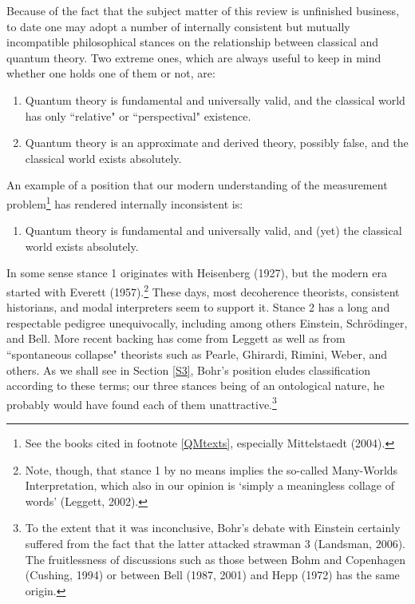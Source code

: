 \documentclass[12pt,titlepage]{article}
\begin{document}
Because of the fact that the subject matter of this review is unfinished business, to date one may adopt a number of internally consistent but mutually incompatible philosophical stances on the relationship between classical and quantum theory. Two extreme ones, which are always useful to keep in mind whether one holds one of them or not, are:
\begin{enumerate}
\item Quantum theory is fundamental and universally valid, and the classical world has 
only ``relative" or ``perspectival" existence.
\item Quantum theory is an approximate and derived theory, possibly false, and the classical world exists absolutely.
\end{enumerate}
An example of a position that our modern understanding of the measurement problem\footnote{See the books cited in footnote \ref{QMtexts}, 
especially Mittelstaedt (2004).}  has rendered internally inconsistent is: 
\begin{enumerate}[resume]
  \item Quantum theory is fundamental and universally valid, and (yet) the classical world exists absolutely.
\end{enumerate}

\noindent
In some sense stance 1 originates with Heisenberg (1927), but the modern era started with
Everett (1957).\footnote{\label{MWM} Note, though,  that stance 1 by no means implies the so-called  Many-Worlds Interpretation, which also in our opinion is `simply a meaningless collage of words' (Leggett, 2002).} These days, most decoherence theorists, consistent historians,
and modal interpreters seem to support it. Stance 2 has a long and respectable pedigree unequivocally, including among others Einstein, Schr\"{o}dinger, and Bell. More recent backing has come from  Leggett as well as from ``spontaneous collapse" theorists such as Pearle, Ghirardi, Rimini, Weber, and others.
As we shall see in Section \ref{S3},  Bohr's position eludes classification according to these terms; our three stances being of an ontological nature, he probably would have found each of them unattractive.\footnote{To the extent that it was inconclusive, Bohr's debate with Einstein certainly suffered from the fact that the latter attacked strawman 3 (Landsman, 2006).
The fruitlessness of discussions such as those between Bohm and Copenhagen (Cushing, 1994) or between  Bell (1987, 2001) and Hepp (1972) has the same origin.} 
\end{document}
